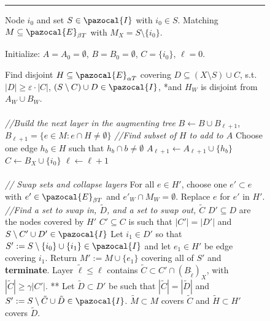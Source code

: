 \begin{figure}
\hrule \vspace{2mm}
\begin{algorithmic}
  {\small 
{} Node $i_0$ and set $S \in \pazocal{I}$ with $i_0 \in S$. Matching $M \subseteq \pazocal{E}_{\beta T}$ with $M_X = S \setminus \{i_0\}$.

\State Initialize: $A=A_0 = \emptyset$, $B=B_0 = \emptyset$, $C = \{i_0\}$, $\ell=0$.

\smallskip
{} %
\State Find disjoint $H \subseteq \pazocal{E}_{\alpha T}$
covering $D \subseteq (X \setminus S) \cup C$, s.t. 
$|D| \geq \varepsilon \cdot |C|$, $(S \setminus C) \cup D \in \pazocal{I}$, *and $H_W$ is disjoint from $A_W \cup B_W$.
\\ 
\\
\textit{//\;Build the next layer in the augmenting tree}
\State $ B \leftarrow B \cup B_{\ell+1}$, $B_{\ell+1} =\{e \in M : e \cap H \neq \emptyset\}$
\State \textit{//\;Find subset of $H$ to add to $A$}
\Indent
  \State Choose one edge $h_b \in H$ such that $h_b \cap b \neq \emptyset$
  \State $A_{\ell +1} \leftarrow A_{\ell+1} \cup \{h_b\}$
  \EndFor
\EndIndent
\State $C \leftarrow B_X \cup \{ i_0\}$
\State $\ell \leftarrow \ell + 1$
\\
\\
\textit{// \; Swap sets and collapse layers}
\State  For all $e \in H'$, choose one $e ' \subset e$ with $e' \in \pazocal{E}_{ \beta T}$ and $e'_W \cap M_W = \emptyset$.
 Replace $e$ for $e'$ in $H'$.
\State \textit{//\;Find a set to swap in, $\tilde{D}$, and a set to swap out, $\tilde{C}$}
\Indent 
  \State $D' \subseteq D$ are the nodes covered by $H'$
  \State $C' \subseteq C$ is such that $|C'|=|D'|$ and $S \setminus C' \cup D' \in \pazocal{I}$ %
    \State Let $i_1 \in D'$ so that $S' := S \setminus \{ i_0\} \cup \{ i_1\} \in \pazocal{I}$ and let $e_1 \in H'$ be edge covering $i_1$.
    \State Return $M' := M \cup \{ e_1\}$ covering all of $S'$ and \textbf{terminate}.
  \EndIf 
  \State Layer $\tilde{\ell} \leq \ell$ contains  $\tilde{C} \subset C' \cap (B_{\tilde{\ell}})_X$, with $|\tilde{C}| \geq \gamma|C'|$. **
  \State Let $\tilde{D} \subset D'$ be such that $|\tilde{C}| = |\tilde{D}|$ and $S' := S \setminus \tilde{C} \cup \tilde{D} \in \pazocal{I}$.
  \State $\tilde{M} \subset M$ covers $\tilde{C}$ and $\tilde{H} \subset H'$ covers $\tilde{D}$. 
\EndIndent

}
\end{algorithmic}
\end{figure}
